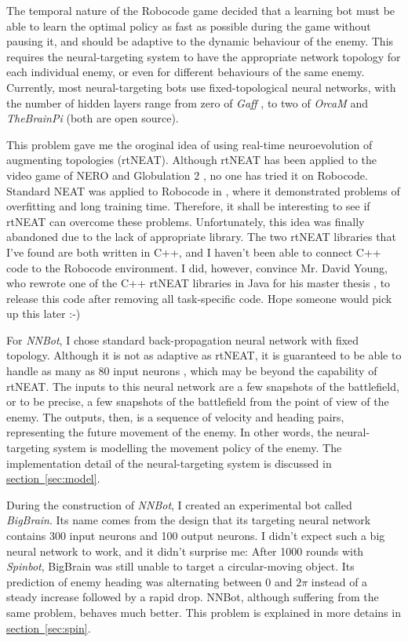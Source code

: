\documentclass[11pt,a4paper]{article}
\begin{document}
The temporal nature of the Robocode game decided that a learning bot must be able to learn the optimal policy as fast as possible during the game without pausing it, and should be adaptive to the dynamic behaviour of the enemy. This requires the neural-targeting system to have the appropriate network topology for each individual enemy, or even for different behaviours of the same enemy. Currently, most neural-targeting bots use fixed-topological neural networks, with the number of hidden layers range from zero of \emph{Gaff} \cite{gaff_talk}, to two of \emph{OrcaM} and \emph{TheBrainPi} (both are open source).

This problem gave me the oroginal idea of using real-time neuroevolution of augmenting topologies (rtNEAT). Although rtNEAT has been applied to the video game of NERO \cite{rtneat_nero} and Globulation 2 \cite{rtneat_globulation}, no one has tried it on Robocode. Standard NEAT was applied to Robocode in \cite{neat_xcs_robocode}, where it demonstrated problems of overfitting and long training time. Therefore, it shall be interesting to see if rtNEAT can overcome these problems. Unfortunately, this idea was finally abandoned due to the lack of appropriate library. The two rtNEAT libraries that I've found are both written in C{\small{++}}, and I haven't been able to connect C{\small{++}} code to the Robocode environment. I did, however, convince Mr. David Young, who rewrote one of the C{\small{++}} rtNEAT libraries in Java for his master thesis \cite{rtneat_starcraft}, to release this code after removing all task-specific code. Hope someone would pick up this later :-)

For \emph{NNBot}, I chose standard back-propagation neural network with fixed topology. Although it is not as adaptive as rtNEAT, it is guaranteed to be able to handle as many as 80 input neurons \cite{gaff_talk}, which may be beyond the capability of rtNEAT. The inputs to this neural network are a few snapshots of the battlefield, or to be precise, a few snapshots of the battlefield from the point of view of the enemy. The outputs, then, is a sequence of velocity and heading pairs, representing the future movement of the enemy. In other words, the neural-targeting system is modelling the movement policy of the enemy. The implementation detail of the neural-targeting system is discussed in \hyperref[sec:model]{section~\ref{sec:model}}.

During the construction of \emph{NNBot}, I created an experimental bot called \emph{BigBrain}. Its name comes from the design that its targeting neural network contains 300 input neurons and 100 output neurons. I didn't expect such a big neural network to work, and it didn't surprise me: After 1000 rounds with \emph{Spinbot}, BigBrain was still unable to target a circular-moving object. Its prediction of enemy heading was alternating between 0 and $2\pi$ instead of a steady increase followed by a rapid drop. NNBot, although suffering from the same problem, behaves much better. This problem is explained in more detains in \hyperref[sec:spin]{section~\ref{sec:spin}}.
\end{document}
